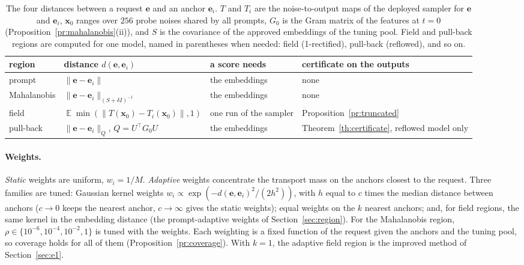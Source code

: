 \documentclass{article}
\DeclareMathOperator{\E}{\mathbb{E}}
\newcommand{\bx}{\mathbf{x}}
\newcommand{\be}{\mathbf{e}}
\theoremstyle{plain}
\theoremstyle{remark}
\begin{document}
\begin{table}[!htbp]
\centering
\caption{The four distances between a request $\be$ and an anchor $\be_i$. $T$ and $T_i$ are the noise-to-output maps of the
deployed sampler for $\be$ and $\be_i$, $\bx_0$ ranges over $256$ probe noises shared by all prompts, $G_0$ is the Gram matrix of
the features at $t=0$ (Proposition~\ref{pr:mahalanobis}(ii)), and $S$ is the covariance of the approved embeddings of the tuning pool.
Field and pull-back regions are computed for one model, named in parentheses when needed: field (1-rectified), pull-back
(reflowed), and so on.}
\label{tab:e2_regions}
\small
\begin{tabular}{l l l l}
\toprule
region & distance $d(\be,\be_i)$ & a score needs & certificate on the outputs\\
\midrule
prompt & $\|\be-\be_i\|$ & the embeddings & none\\
Mahalanobis & $\|\be-\be_i\|_{(S+\delta I)^{-1}}$ & the embeddings & none\\
field & $\E\min(\|T(\bx_0)-T_i(\bx_0)\|,1)$ & one run of the sampler & Proposition~\ref{pr:truncated}\\
pull-back & $\|\be-\be_i\|_Q$, $Q=U^\top G_0U$ & the embeddings & Theorem~\ref{th:certificate}, reflowed model only\\
\bottomrule
\end{tabular}
\end{table}

\paragraph{Weights.}
\emph{Static} weights are uniform, $w_i=1/M$. \emph{Adaptive} weights concentrate the transport mass on the anchors closest to the
request. Three families are tuned: Gaussian kernel weights $w_i\propto\exp(-d(\be,\be_i)^2/(2h^2))$, with $h$ equal to $c$ times the
median distance between anchors ($c\to0$ keeps the nearest anchor, $c\to\infty$ gives the static weights); equal weights on the $k$
nearest anchors; and, for field regions, the same kernel in the embedding distance (the prompt-adaptive weights of
Section~\ref{sec:region}). For the Mahalanobis region, $\rho\in\{10^{-6},10^{-4},10^{-2},1\}$ is tuned with the weights. Each weighting is
a fixed function of the request given the anchors and the tuning pool, so coverage holds for all of them
(Proposition~\ref{pr:coverage}). With $k=1$, the adaptive field region is the improved method of Section~\ref{sec:e1}.
\end{document}
